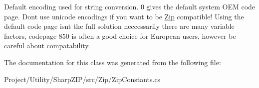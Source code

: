Default encoding used for string conversion. 0 gives the default system O\+EM code page. Dont use unicode encodings if you want to be \hyperlink{namespace_i_c_sharp_code_1_1_sharp_zip_lib_1_1_zip}{Zip} compatible! Using the default code page isnt the full solution neccessarily there are many variable factors, codepage 850 is often a good choice for European users, however be careful about compatability. 



The documentation for this class was generated from the following file\+:\begin{DoxyCompactItemize}
\item 
Project/\+Utility/\+Sharp\+Z\+I\+P/src/\+Zip/Zip\+Constants.\+cs\end{DoxyCompactItemize}
